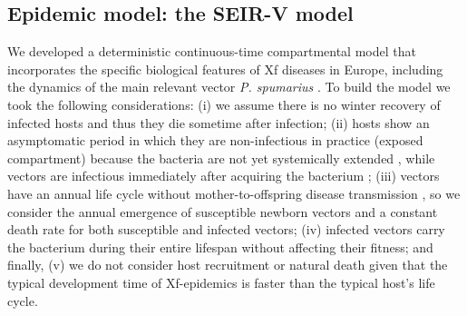 \subsection{Epidemic model: the SEIR-V model}

We developed a deterministic continuous-time compartmental model that
incorporates the specific biological features of Xf diseases in Europe,
including the dynamics of the main relevant vector \textit{P. spumarius}
\cite{Cavalieri2019}. To build the model we took the following
considerations: (i) we assume there is no winter recovery of infected hosts and
thus they die sometime after infection; (ii) hosts show an asymptomatic period
in which they are non-infectious in practice (exposed compartment) because the
bacteria are not yet systemically extended
\cite{teviotdale2003almond,Stevenson238}, while vectors are infectious
immediately after acquiring the bacterium \cite{Fierro2019}; (iii) vectors
have an annual life cycle without mother-to-offspring disease transmission
\cite{freitag1951host,purcell1979evidence}, so we consider the annual
emergence of susceptible newborn vectors and a constant death rate for both
susceptible and infected vectors; (iv) infected vectors carry the bacterium
during their entire lifespan without affecting their fitness; and finally, (v)
we do not consider host recruitment or natural death given that the typical
development time of Xf-epidemics is faster than the typical host's life cycle.

